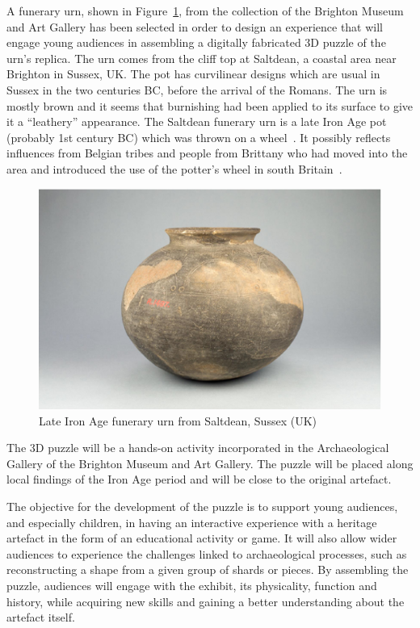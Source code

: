 \documentclass[acmlarge,screen,dvipsnames]{acmart}
\begin{document}
A funerary urn, shown in Figure~\ref{fig:pot}, from the collection of
the Brighton Museum and Art Gallery has been selected in order to
design an experience that will engage young audiences in assembling a
digitally fabricated 3D puzzle of the urn's replica. The urn comes
from the cliff top at Saltdean, a coastal area near Brighton in
Sussex, UK. The pot has curvilinear designs which are usual in Sussex
in the two centuries BC, before the arrival of the Romans. The urn is
mostly brown and it seems that burnishing had been applied to its
surface to give it a ``leathery'' appearance. The Saltdean funerary
urn is a late Iron Age pot (probably 1st century BC) which was thrown
on a wheel~\cite{Toms1912}. It possibly reflects influences from
Belgian tribes and people from Brittany who had moved into the area
and introduced the use of the potter's wheel in south
Britain~\cite{Harding1974,Cunliffe1978,Adkins1982,Cunliffe1995}.
%
\begin{figure}[htb]
  \centering
  \includegraphics[width=0.6\linewidth]{images/pot}
  \caption{\label{fig:pot}
    Late Iron Age funerary urn from Saltdean, Sussex (UK)}
\end{figure}

The 3D puzzle will be a hands-on activity incorporated in the
Archaeological Gallery of the Brighton Museum and Art Gallery. The
puzzle will be placed along local findings of the Iron Age period and
will be close to the original artefact.

The objective for the development of the puzzle is to support young
audiences, and especially children, in having an interactive
experience with a heritage artefact in the form of an educational
activity or game. It will also allow wider audiences to experience the
challenges linked to archaeological processes, such as reconstructing
a shape from a given group of shards or pieces. By assembling the
puzzle, audiences will engage with the exhibit, its physicality,
function and history, while acquiring new skills and gaining a better
understanding about the artefact itself.
\end{document}
